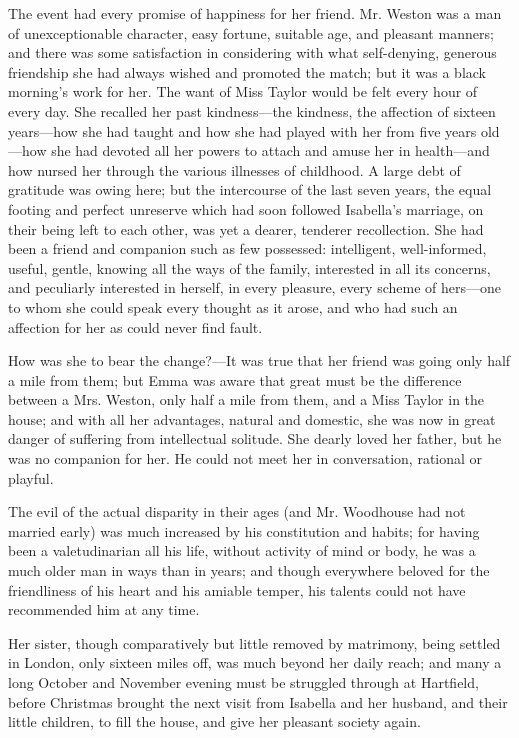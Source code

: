 The event had every promise of happiness for her friend. Mr. Weston was a man of unexceptionable character, easy fortune, suitable age, and pleasant manners; and there was some satisfaction in considering with what self-denying, generous friendship she had always wished and promoted the match; but it was a black morning's work for her. The want of Miss Taylor would be felt every hour of every day. She recalled her past kindness---the kindness, the affection of sixteen years---how she had taught and how she had played with her from five years old---how she had devoted all her powers to attach and amuse her in health---and how nursed her through the various illnesses of childhood. A large debt of gratitude was owing here; but the intercourse of the last seven years, the equal footing and perfect unreserve which had soon followed Isabella's marriage, on their being left to each other, was yet a dearer, tenderer recollection. She had been a friend and companion such as few possessed: intelligent, well-informed, useful, gentle, knowing all the ways of the family, interested in all its concerns, and peculiarly interested in herself, in every pleasure, every scheme of hers---one to whom she could speak every thought as it arose, and who had such an affection for her as could never find fault.

How was she to bear the change?---It was true that her friend was going only half a mile from them; but Emma was aware that great must be the difference between a Mrs. Weston, only half a mile from them, and a Miss Taylor in the house; and with all her advantages, natural and domestic, she was now in great danger of suffering from intellectual solitude. She dearly loved her father, but he was no companion for her. He could not meet her in conversation, rational or playful.

The evil of the actual disparity in their ages (and Mr. Woodhouse had not married early) was much increased by his constitution and habits; for having been a valetudinarian all his life, without activity of mind or body, he was a much older man in ways than in years; and though everywhere beloved for the friendliness of his heart and his amiable temper, his talents could not have recommended him at any time.

Her sister, though comparatively but little removed by matrimony, being settled in London, only sixteen miles off, was much beyond her daily reach; and many a long October and November evening must be struggled through at Hartfield, before Christmas brought the next visit from Isabella and her husband, and their little children, to fill the house, and give her pleasant society again.

